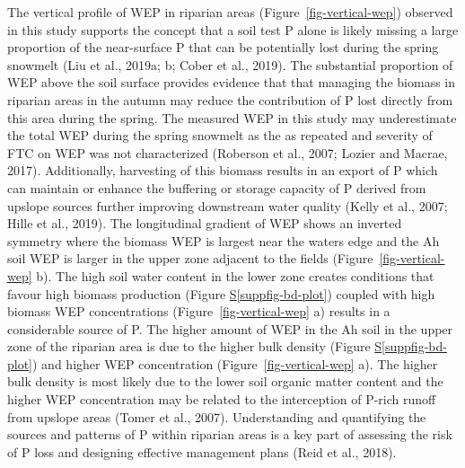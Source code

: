 \documentclass[
]{agujournal2019}
\newcommand*\quartosuppfigref[1]{Figure \hyperref[#1]{S\ref{#1}}}
\begin{document}
The vertical profile of WEP in riparian areas
(Figure~\ref{fig-vertical-wep}) observed in this study supports the
concept that a soil test P alone is likely missing a large proportion of
the near-surface P that can be potentially lost during the spring
snowmelt (Liu et al., 2019a; b; Cober et al., 2019). The substantial
proportion of WEP above the soil surface provides evidence that that
managing the biomass in riparian areas in the autumn may reduce the
contribution of P lost directly from this area during the spring. The
measured WEP in this study may underestimate the total WEP during the
spring snowmelt as the as repeated and severity of FTC on WEP was not
characterized (Roberson et al., 2007; Lozier and Macrae, 2017).
Additionally, harvesting of this biomass results in an export of P which
can maintain or enhance the buffering or storage capacity of P derived
from upslope sources further improving downstream water quality (Kelly
et al., 2007; Hille et al., 2019). The longitudinal gradient of WEP
shows an inverted symmetry where the biomass WEP is largest near the
waters edge and the Ah soil WEP is larger in the upper zone adjacent to
the fields (Figure~\ref{fig-vertical-wep} b). The high soil water
content in the lower zone creates conditions that favour high biomass
production (\quartosuppfigref{suppfig-bd-plot}) coupled with high
biomass WEP concentrations (Figure~\ref{fig-vertical-wep} a) results in
a considerable source of P. The higher amount of WEP in the Ah soil in
the upper zone of the riparian area is due to the higher bulk density
(\quartosuppfigref{suppfig-bd-plot}) and higher WEP concentration
(Figure~\ref{fig-vertical-wep} a). The higher bulk density is most
likely due to the lower soil organic matter content and the higher WEP
concentration may be related to the interception of P-rich runoff from
upslope areas (Tomer et al., 2007). Understanding and quantifying the
sources and patterns of P within riparian areas is a key part of
assessing the risk of P loss and designing effective management plans
(Reid et al., 2018).
\end{document}
